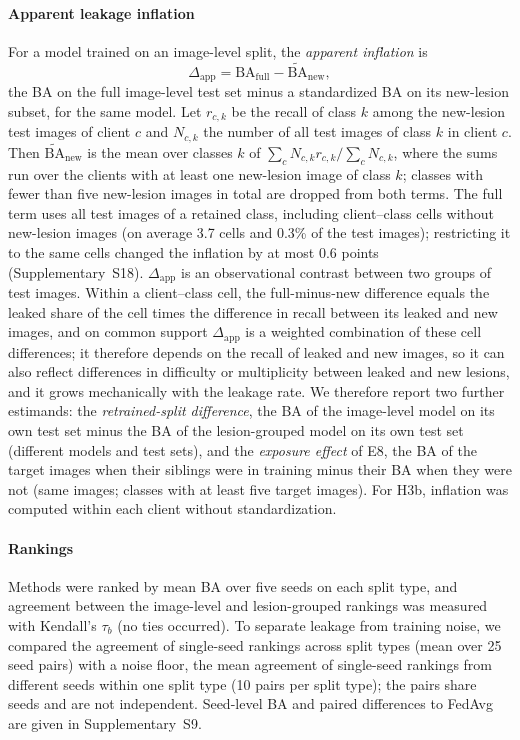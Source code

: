\paragraph{Apparent leakage inflation} For a model trained on an image-level split, the \emph{apparent
inflation} is
\begin{equation}
  \Delta_{\text{app}} = \mathrm{BA}_{\text{full}} - \widetilde{\mathrm{BA}}_{\text{new}},
  \label{eq:inflation}
\end{equation}
the BA on the full image-level test set minus a standardized BA on its new-lesion subset, for the same
model. Let $r_{c,k}$ be the recall of class $k$ among the new-lesion test images of client $c$ and $N_{c,k}$
the number of all test images of class $k$ in client $c$. Then $\widetilde{\mathrm{BA}}_{\text{new}}$ is
the mean over classes $k$ of $\sum_c N_{c,k} r_{c,k}/\sum_c N_{c,k}$, where the sums run over the clients
with at least one new-lesion image of class $k$; classes with fewer than five new-lesion images in total
are dropped from both terms. The full term uses all test images of a retained class, including client--class cells without new-lesion images (on average 3.7 cells and 0.3\% of the test images); restricting it to the same cells changed the inflation by at most 0.6 points (Supplementary~S18). $\Delta_{\text{app}}$ is an observational contrast between two groups of test
images. Within a client--class cell, the full-minus-new difference equals the leaked share of the cell times the difference in recall between its leaked and new images, and on common support $\Delta_{\text{app}}$ is a weighted combination of these cell differences; it therefore depends on the recall of leaked and new
images, so it can also reflect differences in difficulty or multiplicity between leaked and new lesions,
and it grows mechanically with the leakage rate. We therefore report two further estimands: the
\emph{retrained-split difference}, the BA of the image-level model on its own test set minus the BA of the
lesion-grouped model on its own test set (different models and test sets), and the \emph{exposure effect}
of E8, the BA of the target images when their siblings were in training minus their BA when they were
not (same images; classes with at least five target images). For H3b, inflation was computed within each
client without standardization.

\paragraph{Rankings} Methods were ranked by mean BA over five seeds on each split type, and agreement
between the image-level and lesion-grouped rankings was measured with Kendall's $\tau_b$ (no ties occurred). To separate leakage from training noise, we compared the
agreement of single-seed rankings across split types (mean over 25 seed pairs) with a noise floor, the
mean agreement of single-seed rankings from different seeds within one split type (10 pairs per split
type); the pairs share seeds and are not independent. Seed-level BA and paired differences to FedAvg are given in
Supplementary~S9.

